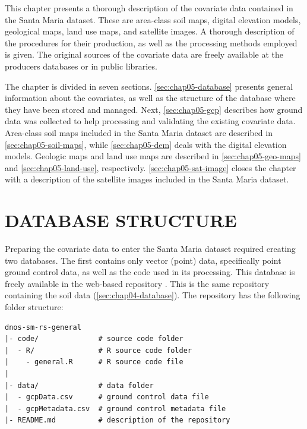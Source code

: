 This chapter presents a thorough description of the covariate data contained in the Santa Maria dataset. 
These are area-class soil maps, digital elevation models, geological maps, land use maps, and satellite 
images. A thorough description of the procedures for their production, as well as the processing methods 
employed is given. The original sources of the covariate data are freely available at the producers databases 
or in public libraries.

The chapter is divided in seven sections. \autoref{sec:chap05-database} presents general information about 
the covariates, as well as the structure of the database where they have been stored and managed. Next, 
\autoref{sec:chap05-gcp} describes how ground data was collected to help processing and validating the 
existing covariate data. Area-class soil maps included in the Santa Maria dataset are described in 
\autoref{sec:chap05-soil-maps}, while \autoref{sec:chap05-dem} deals with the digital elevation models. 
Geologic maps and land use maps are described in \autoref{sec:chap05-geo-maps} and 
\autoref{sec:chap05-land-use}, respectively. \autoref{sec:chap05-sat-image} closes the chapter with a 
description of the satellite images included in the Santa Maria dataset.

\section{DATABASE STRUCTURE}
\label{sec:chap05-database}

Preparing the covariate data to enter the Santa Maria dataset required creating two databases. The first 
contains only vector (point) data, specifically point ground control data, as well as the code used in its 
processing. This database is freely available in the web-based \git{} repository \github{}. This is the same 
repository containing the soil data (\autoref{sec:chap04-database}). The repository has the following folder 
structure:

\begin{verbatim}
dnos-sm-rs-general
|- code/              # source code folder
|  - R/               # R source code folder
|    - general.R      # R source code file
|
|- data/              # data folder
|  - gcpData.csv      # ground control data file
|  - gcpMetadata.csv  # ground control metadata file
|- README.md          # description of the repository
\end{verbatim}

\def\sirgas{\href{http://spatialreference.org/ref/epsg/31982/}{\texttt{EPSG:31982}}}

